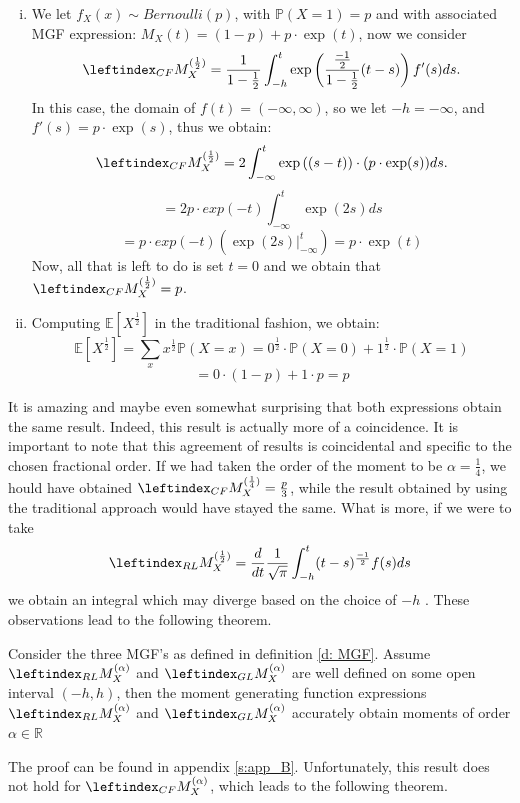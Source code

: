 \begin{example}
    \begin{enumerate}[(i)]
        \item We let \(f_X(x) \sim Bernoulli(p)\), with \(\mathbb{P}(X = 1) = p\) and with associated MGF expression: \(M_X(t) = (1 - p) + p \cdot\exp(t)\), now we consider \[\leftindex_{CF}{M}_X^{(\frac{1}{2})} = \frac{1}{1 - \frac{1}{2}}  \int_{-h}^{t} \exp\left(\frac{\frac{-1}{2}}{1 - \frac{1}{2}}(t-s)\right) f'(s) ds.\] In this case, the domain of \(f(t) = (-\infty, \infty)\), so we let \(-h = -\infty\), and \(f'(s) = p\cdot \exp(s)\), thus we obtain:
        \[\leftindex_{CF}{M}_X^{(\frac{1}{2})} = 2  \int_{-\infty}^{t} \exp\left((s-t)\right) \cdot (p\cdot \exp(s)) ds.\]
        \[= 2p \cdot exp(-t) \int_{-\infty}^{t}\exp(2s) ds\] 
        \[= p\cdot exp(-t) \left(\exp(2s) \Big|_{-\infty}^{t}\right) = p\cdot \exp(t)\]
        Now, all that is left to do is set \(t = 0\) and we obtain that \(\leftindex_{CF}{M}_X^{(\frac{1}{2})} = p\).
        \item Computing \(\mathbb{E}[{X^{\frac{1}{2}}}]\) in the traditional fashion, we obtain: 
        \[\mathbb{E}[{X^{\frac{1}{2}}}] = \sum_x x^{\frac{1}{2}} \mathbb{P}(X = x) = 0^{\frac{1}{2}} \cdot \mathbb{P}(X = 0) + 1^{\frac{1}{2}} \cdot \mathbb{P}(X = 1)\]
        \[ = 0 \cdot(1 - p) + 1 \cdot p = p\]
    \end{enumerate}
    
\end{example}
It is amazing and maybe even somewhat surprising that both expressions obtain the same result. Indeed, this result is actually more of a coincidence. It is important to note that this agreement of results is coincidental and specific to the chosen fractional order. If we had taken the order of the moment to be \(\alpha = \frac{1}{4}\), we hould have obtained \(\leftindex_{CF}{M}_X^{(\frac{1}{4})} = \frac{p}{3}\), while the result obtained by using the traditional approach would have stayed the same. What is more, if we were to take \[\leftindex_{RL}{M}_X^{(\frac{1}{2})}  = \frac{d}{dt} \frac{1}{\sqrt{\pi}}  \int_{-h}^{t} (t - s)^{\frac{-1}{2}} f(s) ds\] we obtain an integral which may diverge based on the choice of \(-h\) . These observations lead to the following theorem.

\begin{theorem}\label{t: MGF_accurate}
     Consider the three MGF's as defined in definition \ref{d: MGF}. Assume \(\leftindex_{RL}{M}_X^{(\alpha)}\) and \(\leftindex_{GL}{M}_X^{(\alpha)}\) are well defined on some open interval \((-h, h)\), then the moment generating function expressions \(\leftindex_{RL}{M}_X^{(\alpha)}\) and \(\leftindex_{GL}{M}_X^{(\alpha)}\) accurately obtain moments of order \(\alpha \in \mathbb{R}\)
    
\end{theorem}
The proof can be found in appendix \ref{s:app_B}.
Unfortunately, this result does not hold for \(\leftindex_{CF}{M}_X^{(\alpha)}\), which leads to the following theorem.

